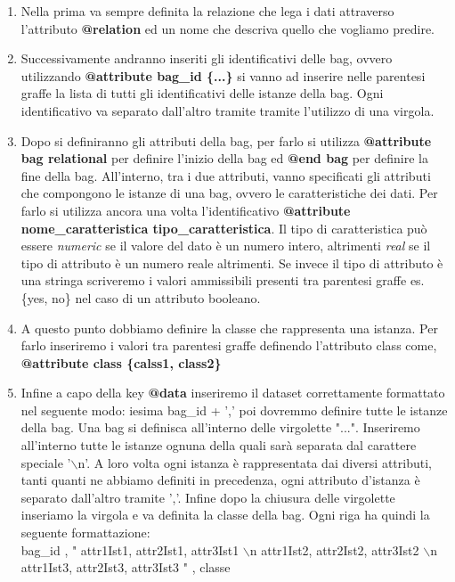 \begin{enumerate}
        \item Nella prima va sempre definita la relazione che lega i dati attraverso l'attributo \textbf{@relation} ed un nome che descriva quello che vogliamo predire.  
        
        \item Successivamente andranno inseriti gli identificativi delle bag, ovvero utilizzando \textbf{@attribute bag\_id \{...\}} si vanno ad inserire nelle parentesi graffe la lista di tutti gli identificativi delle istanze della bag. Ogni identificativo va separato dall'altro tramite tramite l'utilizzo di una virgola. 
        
        \item Dopo si definiranno gli attributi della bag, per farlo si utilizza \textbf{@attribute bag relational} per definire l'inizio della bag ed \textbf{@end bag} per definire la fine della bag. All'interno, tra i due attributi, vanno specificati gli attributi che compongono le istanze di una bag, ovvero le caratteristiche dei dati. Per farlo si utilizza ancora una volta l'identificativo \textbf{@attribute nome\_caratteristica tipo\_caratteristica}. Il tipo di caratteristica può essere \textit{numeric} se il valore del dato è un numero intero, altrimenti \textit{real} se il tipo di attributo è un numero reale altrimenti. Se invece il tipo di attributo è una stringa scriveremo i valori ammissibili presenti tra parentesi graffe es. {\{yes, no\}} nel caso di un attributo booleano.
        
        \item A questo punto dobbiamo definire la classe che rappresenta una istanza. Per farlo inseriremo i valori tra parentesi graffe definendo l'attributo class come, \textbf{@attribute class \{calss1, class2\}}
        
        \item Infine a capo della key \textbf{@data} inseriremo il dataset correttamente formattato nel seguente modo: iesima bag\_id + ',' poi dovremmo definire tutte le istanze della bag. Una bag si definisca all'interno delle virgolette "...". Inseriremo all'interno tutte le istanze ognuna della quali sarà separata dal carattere speciale '$\backslash$n'. A loro volta ogni istanza è rappresentata dai diversi attributi, tanti quanti ne abbiamo definiti in precedenza, ogni attributo d'istanza è separato dall'altro tramite ','. Infine dopo la chiusura delle virgolette inseriamo la virgola e va definita la classe della bag. Ogni riga ha quindi la seguente formattazione:
        \\\footnotesize {
        bag\_id , " attr1Ist1, attr2Ist1, attr3Ist1 $\backslash$n attr1Ist2, attr2Ist2, attr3Ist2 $\backslash$n attr1Ist3, attr2Ist3, attr3Ist3 " , classe  }
    \end{enumerate}
